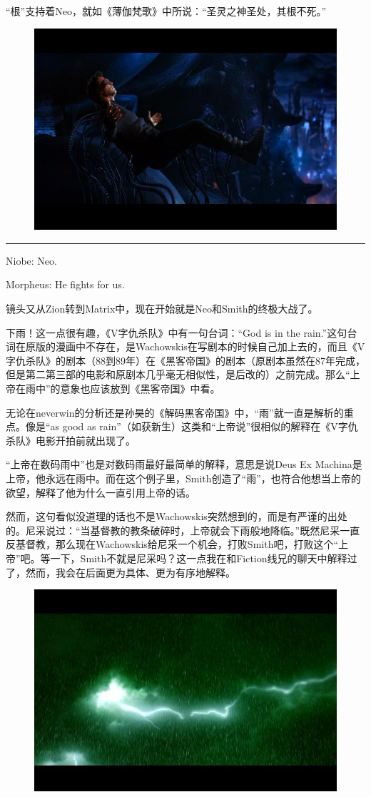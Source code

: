 \documentclass[UTF8]{ctexart}
\newcommand{\myparsep}{\noindent \rule[0.5ex]{\linewidth}{1pt}}
\newenvironment{myquote}{\color{green} \setlength{\leftskip}{6em} \setlength{\rightskip}{4em} \setlength{\parindent}{-2em}}{\par}
\begin{document}
“根”支持着Neo，就如《薄伽梵歌》中所说：“圣灵之神圣处，其根不死。”

\begin{figure}[htb]
\centering
\includegraphics[width=0.5\linewidth]{fig/42486159847ef02b2834f0d3.jpg}
\end{figure}

\myparsep

\begin{myquote}
Niobe: Neo.

Morpheus: He fights for us.
\end{myquote}

镜头又从Zion转到Matrix中，现在开始就是Neo和Smith的终极大战了。

下雨！这一点很有趣，《V字仇杀队》中有一句台词：“God is in the rain.”这句台词在原版的漫画中不存在，是Wachowskis在写剧本的时候自己加上去的，而且《V字仇杀队》的剧本（88到89年）在《黑客帝国》的剧本（原剧本虽然在87年完成，但是第二第三部的电影和原剧本几乎毫无相似性，是后改的）之前完成。那么“上帝在雨中”的意象也应该放到《黑客帝国》中看。

无论在neverwin的分析还是孙昊的《解码黑客帝国》中，“雨”就一直是解析的重点。像是“as good as rain”（如获新生）这类和“上帝说”很相似的解释在《V字仇杀队》电影开拍前就出现了。

“上帝在数码雨中”也是对数码雨最好最简单的解释，意思是说Deus Ex Machina是上帝，他永远在雨中。而在这个例子里，Smith创造了“雨”，也符合他想当上帝的欲望，解释了他为什么一直引用上帝的话。

然而，这句看似没道理的话也不是Wachowskis突然想到的，而是有严谨的出处的。尼采说过：“当基督教的教条破碎时，上帝就会下雨般地降临。”既然尼采一直反基督教，那么现在Wachowskis给尼采一个机会，打败Smith吧，打败这个“上帝”吧。等一下，Smith不就是尼采吗？这一点我在和Fiction线兄的聊天中解释过了，然而，我会在后面更为具体、更为有序地解释。

\begin{figure}[htb]
\centering
\includegraphics[width=0.5\linewidth]{fig/39cd2fdd6b9f58d88d1029d3.jpg}
\end{figure}
\end{document}
